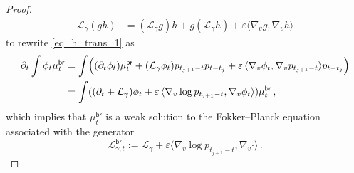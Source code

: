 \documentclass[12pt]{article}
\theoremstyle{plain}
\theoremstyle{plain}
\theoremstyle{remark}
\newcommand{\cL}{\mathcal{L}}
\newcommand{\msf}[1]{\mathsf{#1}}
\newcommand{\1}{\bm{1}}
\theoremstyle{plain}
\theoremstyle{definition}
\theoremstyle{remark}
\begin{document}
\begin{proof}
\begin{equation*}
\begin{aligned}
\mathcal{L}_\gamma(g h) &=(\mathcal{L}_\gamma g) h  + g(\mathcal{L}_\gamma h) + \varepsilon \langle \nabla_{v} g, \nabla_v h\rangle
\end{aligned}
\end{equation*}
to rewrite \eqref{eq_h_trans_1} as
\begin{align}\label{eq_h_trans_2}
\begin{split}
\partial_t \int \phi_t \mu_t^{\msf{br}} &=
\int \Bigl((\partial_t \phi_t)\mu_t^{\mathsf{br}} +  (\mathcal{L}_\gamma \phi_t) p_{t_{j+1}-t} p_{t-t_{j}} + \varepsilon\, \langle \nabla_v \phi_t, \nabla_v p_{t_{j+1}-t} \rangle p_{t - t_j}\Bigr) \\
 &= \int ( (\partial_t + \mathcal{L}_\gamma) \phi_t   + \varepsilon \, \langle \nabla_v \log p_{t_{j+1}-t}, \nabla_v \phi_t\rangle  )\mu_t^{\msf{br}} \,,
\end{split}
\end{align}
which implies that $\mu_t^{\msf{br}}$ is a weak solution to the Fokker--Planck equation associated with the generator
\begin{equation*}
\mathcal{L}^{\msf{br}}_{\gamma, t} := \cL_\gamma + \varepsilon  \langle \nabla_v \log p_{t_{j+1}-t}, \nabla_v \cdot \rangle\,.
\end{equation*}
\end{proof}
\end{document}

